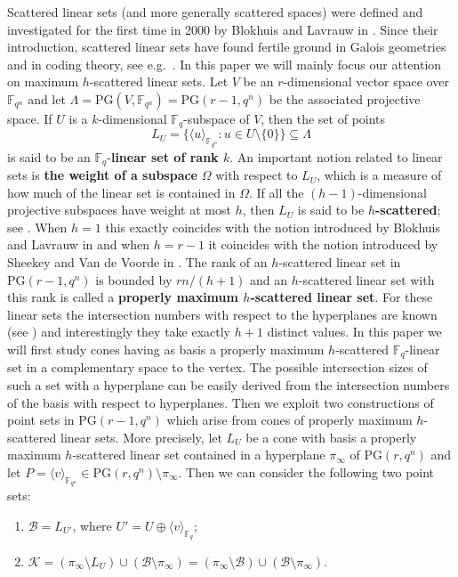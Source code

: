 \documentclass[11pt]{amsart}
\newcommand{\fqn}{\mathbb{F}_{q^n}}
\newcommand{\F}{{\mathbb F}}
\newcommand{\fq}{{\mathbb F}_{q}}
\newcommand{\la}{\langle}
\newcommand{\ra}{\rangle}
\newcommand{\PG}{\mathrm{PG}}
\begin{document}
Scattered linear sets (and more generally scattered spaces) were defined and investigated for the first time in 2000 by Blokhuis and Lavrauw in \cite{blokhuis2000scattered}. Since their introduction, scattered linear sets have found fertile ground in Galois geometries and in coding theory, see e.g.\ \cite{lavrauw2016scattered,polverino2020connections}.
In this paper we will mainly focus our attention on maximum $h$-scattered linear sets.
Let $V$ be an $r$-dimensional vector space over $\fqn$ and let $\Lambda=\PG(V,\F_{q^n})=\PG(r-1,q^n)$ be the associated projective space.
If $U$ is a $k$-dimensional $\fq$-subspace of $V$, then the set of points
\[ L_U=\{\la {u} \ra_{\mathbb{F}_{q^n}} : { u}\in U\setminus \{{ 0} \}\}\subseteq \Lambda \]
is said to be an $\fq$-\textbf{linear set of rank $k$}.
An important notion related to linear sets is \textbf{the weight of a subspace} $\Omega$ with respect to $L_U$, which is a measure of how much of the linear set is contained in $\Omega$. 
If all the $(h-1)$-dimensional projective subspaces have weight at most $h$, then $L_U$ is said to be \textbf{$h$-scattered}; see \cite{csajbok2021generalising}. When $h=1$ this exactly coincides with the notion introduced by Blokhuis and Lavrauw in \cite{blokhuis2000scattered} and when $h=r-1$ it coincides with the notion introduced by Sheekey and Van de Voorde in \cite{sheekeyVdV}. 
The rank of an $h$-scattered linear set in $\PG(r-1,q^n)$ is bounded by $rn/(h+1)$ and an $h$-scattered linear set with this rank is called a \textbf{properly maximum $h$-scattered linear set}. 
For these linear sets the intersection numbers with respect to the hyperplanes are known (see \cite{blokhuis2000scattered,csajbok2021generalising,zini2021scattered}) and interestingly they take exactly $h+1$ distinct values.
In this paper we will first study cones having as basis a properly maximum $h$-scattered $\fq$-linear set in a complementary space to the vertex. 
The possible intersection sizes of such a set with a hyperplane can be easily derived from the intersection numbers of the basis with respect to hyperplanes.
Then we exploit two constructions of point sets in $\PG(r-1,q^n)$ which arise from cones of properly maximum $h$-scattered linear sets. More precisely, let $L_U$ be a cone with basis a properly maximum $h$-scattered linear set contained in a hyperplane $\pi_{\infty}$ of $\PG(r,q^n)$ and let $P=\langle v \rangle_{\fqn}\in \PG(r,q^n)\setminus \pi_{\infty}$. Then we can consider the following two point sets:
\begin{enumerate}
    \item $\mathcal{B}=L_{U'}$, where $U'=U\oplus \langle v \rangle_{\fq}$;
    \item $\mathcal{K}=(\pi_{\infty}\setminus L_U)\cup (\mathcal{B} \setminus \pi_{\infty})=(\pi_{\infty}\setminus \mathcal B)\cup (\mathcal B \setminus \pi_{\infty})$.
\end{enumerate}
\end{document}
